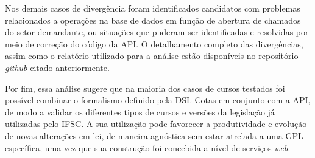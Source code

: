 Nos demais casos de divergência foram identificados candidatos com problemas relacionados a operações na base de dados em função de abertura de chamados do setor demandante, ou situações que puderam ser identificadas e resolvidas por meio de correção do código da API. O detalhamento completo das divergências, assim como o relatório utilizado para a análise estão disponíveis no repositório \textit{github} citado anteriormente.

Por fim, essa análise sugere que na maioria dos casos de cursos testados foi possível combinar o formalismo definido pela DSL Cotas em conjunto com a API, de modo a validar os diferentes tipos de cursos e versões da legislação já utilizadas pelo \gls{IFSC}. A sua utilização pode favorecer a produtividade e evolução de novas alterações em lei, de maneira agnóstica sem estar atrelada a uma \gls{GPL} específica, uma vez que sua construção foi concebida a nível de serviços \textit{web}.